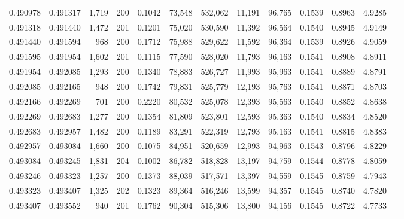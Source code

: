 \begin{tabular}{rrrrrrrrrrrrr}
0.490978 & 0.491317 & 1,719 & 200 &                                     0.1042 &  73,548 & 532,062 &  11,191 &  96,765 & 0.1539 & 0.8963 & 4.9285 \\
0.491318 & 0.491440 & 1,472 & 201 &                                     0.1201 &  75,020 & 530,590 &  11,392 &  96,564 & 0.1540 & 0.8945 & 4.9149 \\
0.491440 & 0.491594 &   968 & 200 &                                     0.1712 &  75,988 & 529,622 &  11,592 &  96,364 & 0.1539 & 0.8926 & 4.9059 \\
0.491595 & 0.491954 & 1,602 & 201 &                                     0.1115 &  77,590 & 528,020 &  11,793 &  96,163 & 0.1541 & 0.8908 & 4.8911 \\
0.491954 & 0.492085 & 1,293 & 200 &                                     0.1340 &  78,883 & 526,727 &  11,993 &  95,963 & 0.1541 & 0.8889 & 4.8791 \\
0.492085 & 0.492165 &   948 & 200 &                                     0.1742 &  79,831 & 525,779 &  12,193 &  95,763 & 0.1541 & 0.8871 & 4.8703 \\
0.492166 & 0.492269 &   701 & 200 &                                     0.2220 &  80,532 & 525,078 &  12,393 &  95,563 & 0.1540 & 0.8852 & 4.8638 \\
0.492269 & 0.492683 & 1,277 & 200 &                                     0.1354 &  81,809 & 523,801 &  12,593 &  95,363 & 0.1540 & 0.8834 & 4.8520 \\
0.492683 & 0.492957 & 1,482 & 200 &                                     0.1189 &  83,291 & 522,319 &  12,793 &  95,163 & 0.1541 & 0.8815 & 4.8383 \\
0.492957 & 0.493084 & 1,660 & 200 &                                     0.1075 &  84,951 & 520,659 &  12,993 &  94,963 & 0.1543 & 0.8796 & 4.8229 \\
0.493084 & 0.493245 & 1,831 & 204 &                                     0.1002 &  86,782 & 518,828 &  13,197 &  94,759 & 0.1544 & 0.8778 & 4.8059 \\
0.493246 & 0.493323 & 1,257 & 200 &                                     0.1373 &  88,039 & 517,571 &  13,397 &  94,559 & 0.1545 & 0.8759 & 4.7943 \\
0.493323 & 0.493407 & 1,325 & 202 &                                     0.1323 &  89,364 & 516,246 &  13,599 &  94,357 & 0.1545 & 0.8740 & 4.7820 \\
0.493407 & 0.493552 &   940 & 201 &                                     0.1762 &  90,304 & 515,306 &  13,800 &  94,156 & 0.1545 & 0.8722 & 4.7733 \\

\end{tabular}
